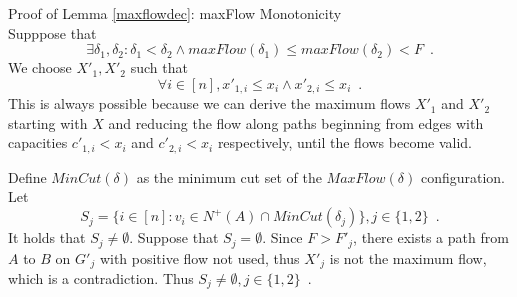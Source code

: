 \begin{sepproof}{Proof of Lemma \ref{maxflowdec}: maxFlow Monotonicity} \ \\
  Supppose that
  \begin{equation*}
    \exists \delta_1, \delta_2 : \delta_1 < \delta_2 \wedge maxFlow\left(\delta_1\right) \leq maxFlow\left(\delta_2\right)
    < F \enspace.
  \end{equation*}
  We choose $X'_1, X'_2$ such that
  \begin{equation*}
    \forall i \in [n], x'_{1, i} \leq x_i \wedge x'_{2, i} \leq x_i \enspace.
  \end{equation*}
  This is always possible because we can derive the maximum flows $X'_1$ and $X'_2$ starting with $X$ and reducing the flow
  along paths beginning from edges with capacities $c'_{1,i} < x_i$ and $c'_{2,i} < x_i$ respectively, until the flows become
  valid.

  Define $MinCut\left(\delta\right)$ as the minimum cut set of the $MaxFlow\left(\delta\right)$ configuration. Let
  \begin{equation*}
    S_j = \{i \in [n] : v_i \in N^{+}\left(A\right) \cap MinCut\left(\delta_j\right)\}, j \in \{1, 2\} \enspace.
  \end{equation*}
  It holds that $S_j \neq \emptyset$. Suppose that $S_j = \emptyset$. Since $F > F'_j$, there exists a path from $A$ to $B$
  on $G'_j$ with positive flow not used, thus $X'_j$ is not the maximum flow, which is a contradiction. Thus
  $S_j \neq \emptyset, j \in \{1, 2\} \enspace.$


\end{sepproof}

